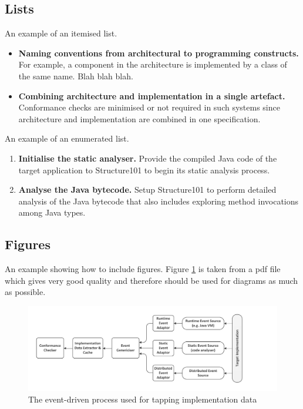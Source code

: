 \newpage
\subsection{Lists}
An example of an itemised list.

\begin{itemize}
\item \textbf{Naming conventions from architectural to programming constructs.} For example, a component in the architecture is implemented by a class of the same name. Blah blah blah.

\item \textbf{Combining architecture and implementation in a single artefact.} Conformance checks are minimised or not required in such systems since architecture and implementation are combined in one specification.
\end{itemize}

An example of an enumerated list.

\begin{enumerate}
\item \textbf{Initialise the static analyser.} Provide the compiled Java code of the target application to Structure101 to begin its static analysis process.

\item \textbf{Analyse the Java bytecode.} Setup Structure101 to perform detailed analysis of the Java bytecode that also includes exploring method invocations among Java types.
\end{enumerate}


\subsection{Figures}
An example showing how to include figures. Figure \ref{fig:eventdriven} is taken from a pdf file which gives very good quality and therefore should be used for diagrams as much as possible.

\begin{figure}[h]
	\centering
	\includegraphics[width=\textwidth,trim=20 16 96 16]{fig-eventdriven.pdf}
	\caption{The event-driven process used for tapping implementation data}
	\label{fig:eventdriven}
\end{figure}


